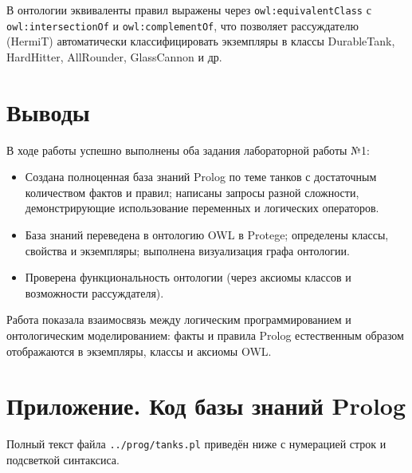 \documentclass[12pt,a4paper]{article}
\begin{document}
В онтологии эквиваленты правил выражены через \texttt{owl:equivalentClass} с \texttt{owl:intersectionOf} и \texttt{owl:complementOf}, что позволяет рассуждателю (HermiT) автоматически классифицировать экземпляры в классы DurableTank, HardHitter, AllRounder, GlassCannon и др.

\section{Выводы}

В ходе работы успешно выполнены оба задания лабораторной работы №1:
\begin{itemize}
    \item Создана полноценная база знаний Prolog по теме танков с достаточным количеством фактов и правил; написаны запросы разной сложности, демонстрирующие использование переменных и логических операторов.
    \item База знаний переведена в онтологию OWL в Protege; определены классы, свойства и экземпляры; выполнена визуализация графа онтологии.
    \item Проверена функциональность онтологии (через аксиомы классов и возможности рассуждателя).
\end{itemize}

Работа показала взаимосвязь между логическим программированием и онтологическим моделированием: факты и правила Prolog естественным образом отображаются в экземпляры, классы и аксиомы OWL.

\section{Приложение. Код базы знаний Prolog}

Полный текст файла \texttt{../prog/tanks.pl} приведён ниже с нумерацией строк и подсветкой синтаксиса.


\end{document}
